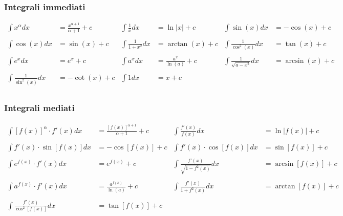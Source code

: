 \documentclass[a4paper]{article}
\begin{document}
	\subsubsection*{Integrali immediati}
	\begin{align*}
		\int x^\alpha dx            & = \frac{x^{\alpha + 1}}{\alpha + 1} +c & \int \frac{1}{x}dx     & = \ln|x| + c              & \int \sin (x) dx              & = -\cos(x) + c    \\
		                            &                                        &  \\
		\int \cos (x) dx            & = \sin (x) +c                          & \int \frac{1}{1+x^2}dx & = \arctan (x) +c          & \int \frac{1}{\cos^2 (x)}dx   & = \tan (x) + c    \\
		                            &                                        &  \\
		\int e^x dx                 & = e^x +c                               & \int a^x dx            & = \frac{a^x}{\ln (a)} + c & \int \frac{1}{\sqrt{a-x^2}}dx & = \arcsin (x) + c \\
		                            &  \\
		\int \frac{1}{\sin^2 (x)}dx & = -\cot(x) + c                         & \int 1 dx              & = x+c                     &\\
	\end{align*}
	
	\subsubsection*{Integrali mediati}
	\begin{align*}
		\int [f(x)]^\alpha \cdot f'(x) dx 	&= \frac{[f(x)]^{\alpha + 1}}{\alpha + 1}+c		&	\int \frac{f'(x)}{f(x)}dx &= \ln |f(x)| + c\\\\
		\int f'(x) \cdot \sin [f(x)] dx		&= -\cos [f(x)] + c								&	\int f'(x) \cdot \cos [f(x)] dx &= \sin [f(x)] + c\\\\
		\int e^{f(x)} \cdot f'(x) dx 		&= e^{f(x)}+c									&	\int \frac{f'(x)}{\sqrt{1-f^2(x)}}dx &= \arcsin[f(x)] + c\\\\
		\int a^{f(x)} \cdot f'(x) dx		&= \frac{a^{f(x)}}{\ln (a)}+c					&	\int \frac{f'(x)}{1+f^2(x)}dx &= \arctan [f(x)] + c\\\\
		\int \frac{f'(x)}{\cos^2 [f(x)]}dx	&= \tan [f(x)] + c  		
	\end{align*}
\end{document}

